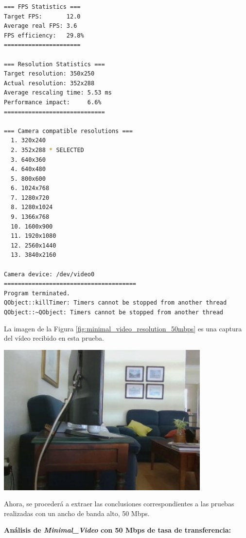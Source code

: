 \begin{lstlisting}[language=bash,basicstyle=\ttfamily\tiny]
=== FPS Statistics ===
Target FPS:       12.0
Average real FPS: 3.6
FPS efficiency:   29.8%
======================

=== Resolution Statistics ===
Target resolution: 350x250
Actual resolution: 352x288
Average rescaling time: 5.53 ms
Performance impact:     6.6%
=============================

=== Camera compatible resolutions ===
  1. 320x240
  2. 352x288 * SELECTED
  3. 640x360
  4. 640x480
  5. 800x600
  6. 1024x768
  7. 1280x720
  8. 1280x1024
  9. 1366x768
  10. 1600x900
  11. 1920x1080
  12. 2560x1440
  13. 3840x2160

Camera device: /dev/video0
======================================
Program terminated.
QObject::killTimer: Timers cannot be stopped from another thread
QObject::~QObject: Timers cannot be stopped from another thread
\end{lstlisting}
\vspace{\baselineskip}

\newpage
La imagen de la Figura \ref{fig:minimal_video_resolution_50mbps} es una captura del vídeo recibido en esta prueba.
\begin{center}
  \includegraphics[width = 0.8\textwidth]{images/VideoRecibido3.3.png}
  \label{fig:minimal_video_resolution_50mbps}
\end{center}

\newpage

Ahora, se procederá a extraer las conclusiones correspondientes a las pruebas realizadas con un ancho de banda alto, 50 Mbps.
\vspace{\baselineskip}

\textbf{Análisis de \textit{Minimal\_Video} con 50 Mbps de tasa de transferencia:}
\vspace{\baselineskip}

